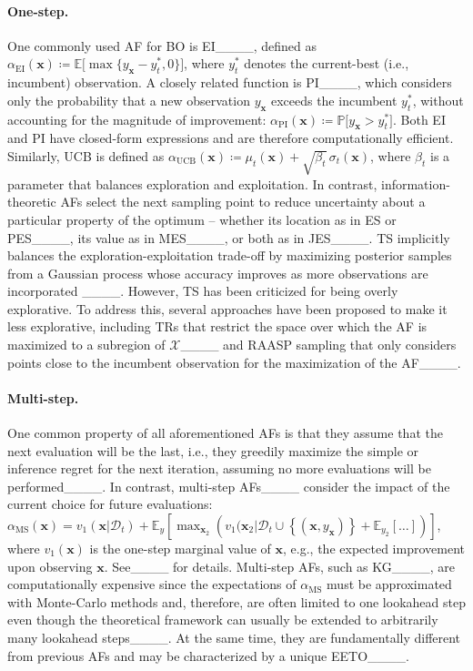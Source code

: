 \paragraph{One-step.} 
One commonly used \ac{AF} for \ac{BO} is \acf{EI}____, defined as $ \alpha_{\text{EI}}(\bm{x}) \coloneqq \mathbb{E}\bigl[\max\{y_{\bm{x}} - y_t^\ast, 0\}\bigr]$, where $y_t^\ast$ denotes the current-best (i.e., incumbent) observation. A closely related function is \ac{PI}____, which considers only the probability that a new observation $y_{\bm{x}}$ exceeds the incumbent $y_t^\ast$, without accounting for the magnitude of improvement: $ \alpha_{\text{PI}}(\bm{x}) \coloneqq \mathbb{P}\bigl[y_{\bm{x}} > y_t^\ast\bigr]$. Both \ac{EI} and \ac{PI} have closed-form expressions and are therefore computationally efficient. Similarly, \ac{UCB} is defined as $ \alpha_{\text{UCB}}(\bm{x}) \coloneqq \mu_t(\bm{x}) + \sqrt{\beta_t}\,\sigma_t(\bm{x})$, where $\beta_t$ is a parameter that balances exploration and exploitation. In contrast, information-theoretic \acp{AF} select the next sampling point to reduce uncertainty about a particular property of the optimum -- whether its location as in \ac{ES} or \ac{PES}____, its value as in \ac{MES}____, or both as in \ac{JES}____. 
\ac{TS} implicitly balances the exploration-exploitation trade-off by maximizing posterior samples from a Gaussian process whose accuracy improves as more observations are incorporated ____. However, \ac{TS} has been criticized for being overly explorative.
To address this, several approaches have been proposed to make it less explorative, including \acp{TR} that restrict the space over which the \ac{AF} is maximized to a subregion of $\mathcal{X}$____ and \ac{RAASP} sampling that only considers points close to the incumbent observation for the maximization of the \ac{AF}____.

\paragraph{Multi-step.}
One common property of all aforementioned \acp{AF} is that they assume that the next evaluation will be the last, i.e., they greedily maximize the simple or inference regret for the next iteration, assuming no more evaluations will be performed____.
In contrast, multi-step \acp{AF}____ consider the impact of the current choice for future evaluations: $\alpha_{\text{MS}}(\bm{x}) = v_1(\bm{x}|\mathcal{D}_t)+\mathbb{E}_y\left[\max_{\bm{x}_2}\left(v_1(\bm{x}_2\vert\mathcal{D}_t\cup\left\{(\bm{x},y_{\bm x})\right\}+\mathbb{E}_{y_2}\left[\ldots\right]\right)\right]$,
where $v_1(\bm{x})$ is the one-step marginal value of $\bm{x}$, e.g., the expected improvement upon observing $\bm{x}$.
See____ for details.
Multi-step \acp{AF}, such as \ac{KG}____, are computationally expensive since the expectations of $\alpha_{\text{MS}}$ must be approximated with Monte-Carlo methods and, therefore, are often limited to one lookahead step even though the theoretical framework can usually be extended to arbitrarily many lookahead steps____.
At the same time, they are fundamentally different from previous \acp{AF} and may be characterized by a unique \ac{EETO}____.

